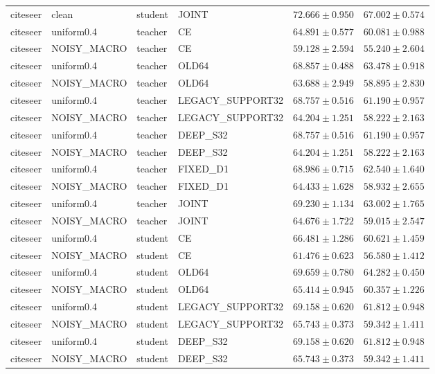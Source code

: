\begin{longtable}{llllrr}
citeseer & clean & student & JOINT & $72.666 \pm 0.950$ & $67.002 \pm 0.574$ \\
citeseer & uniform0.4 & teacher & CE & $64.891 \pm 0.577$ & $60.081 \pm 0.988$ \\
citeseer & NOISY\_MACRO & teacher & CE & $59.128 \pm 2.594$ & $55.240 \pm 2.604$ \\
citeseer & uniform0.4 & teacher & OLD64 & $68.857 \pm 0.488$ & $63.478 \pm 0.918$ \\
citeseer & NOISY\_MACRO & teacher & OLD64 & $63.688 \pm 2.949$ & $58.895 \pm 2.830$ \\
citeseer & uniform0.4 & teacher & LEGACY\_SUPPORT32 & $68.757 \pm 0.516$ & $61.190 \pm 0.957$ \\
citeseer & NOISY\_MACRO & teacher & LEGACY\_SUPPORT32 & $64.204 \pm 1.251$ & $58.222 \pm 2.163$ \\
citeseer & uniform0.4 & teacher & DEEP\_S32 & $68.757 \pm 0.516$ & $61.190 \pm 0.957$ \\
citeseer & NOISY\_MACRO & teacher & DEEP\_S32 & $64.204 \pm 1.251$ & $58.222 \pm 2.163$ \\
citeseer & uniform0.4 & teacher & FIXED\_D1 & $68.986 \pm 0.715$ & $62.540 \pm 1.640$ \\
citeseer & NOISY\_MACRO & teacher & FIXED\_D1 & $64.433 \pm 1.628$ & $58.932 \pm 2.655$ \\
citeseer & uniform0.4 & teacher & JOINT & $69.230 \pm 1.134$ & $63.002 \pm 1.765$ \\
citeseer & NOISY\_MACRO & teacher & JOINT & $64.676 \pm 1.722$ & $59.015 \pm 2.547$ \\
citeseer & uniform0.4 & student & CE & $66.481 \pm 1.286$ & $60.621 \pm 1.459$ \\
citeseer & NOISY\_MACRO & student & CE & $61.476 \pm 0.623$ & $56.580 \pm 1.412$ \\
citeseer & uniform0.4 & student & OLD64 & $69.659 \pm 0.780$ & $64.282 \pm 0.450$ \\
citeseer & NOISY\_MACRO & student & OLD64 & $65.414 \pm 0.945$ & $60.357 \pm 1.226$ \\
citeseer & uniform0.4 & student & LEGACY\_SUPPORT32 & $69.158 \pm 0.620$ & $61.812 \pm 0.948$ \\
citeseer & NOISY\_MACRO & student & LEGACY\_SUPPORT32 & $65.743 \pm 0.373$ & $59.342 \pm 1.411$ \\
citeseer & uniform0.4 & student & DEEP\_S32 & $69.158 \pm 0.620$ & $61.812 \pm 0.948$ \\
citeseer & NOISY\_MACRO & student & DEEP\_S32 & $65.743 \pm 0.373$ & $59.342 \pm 1.411$ \\

\end{longtable}
